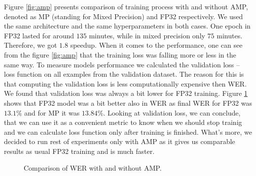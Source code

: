 \documentclass[licencjacka,en]{pracamgr}
\begin{document}
	Figure \ref{fig:amp} presents comparison of training process with and without AMP, denoted as MP (standing for Mixed Precision) and FP32 respectively. We used the same architecture and the same hyperparameters in both cases. One epoch in FP32 lasted for around $135$ minutes, while in mixed precision only $75$ minutes. Therefore, we got $1.8$ speedup. When it comes to the performance, one can see from the figure \ref{fig:amp} that the training loss was falling more or less in the same way. To measure models performance we calculated the validation loss -- loss function on all examples from the validation dataset. The reason for this is that computing the validation loss is less computationally expensive then WER. We found that validation loss was always a bit lower for FP32 training. Figure \ref{fig:wer} shows that FP32 model was a bit better also in WER as final WER for FP32 was $13.1$\% and for MP it was $13.84$\%. Looking at validation loss, we can conclude, that we can use it as a convenient metric to know when we should stop trainig and we can calculate loss function only after training is finished. What's more, we decided to run rest of experiments only with AMP as it gives us comparable results as usual FP32 training and is much faster.
	
	
	\wercomp
	
	\begin{figure}[!hbt]
		\begin{center}
		\end{center}
		\caption{Comparison of WER with and without AMP.}
		\label{fig:wer}
	\end{figure}
    
\end{document}
